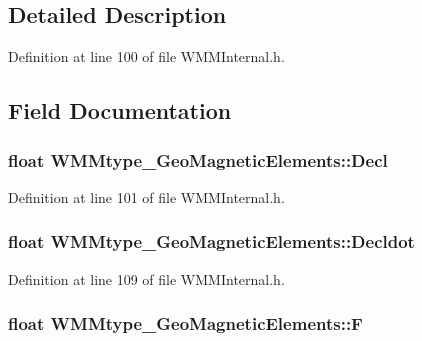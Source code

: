 \subsection{Detailed Description}


Definition at line 100 of file W\-M\-M\-Internal.\-h.



\subsection{Field Documentation}
\hypertarget{struct_w_m_mtype___geo_magnetic_elements_a9a93785970d529cbca6172d59ca0d225}{
\subsubsection[{Decl}]{\setlength{\rightskip}{0pt plus 5cm}float W\-M\-Mtype\-\_\-\-Geo\-Magnetic\-Elements\-::\-Decl}}\label{struct_w_m_mtype___geo_magnetic_elements_a9a93785970d529cbca6172d59ca0d225}


Definition at line 101 of file W\-M\-M\-Internal.\-h.

\hypertarget{struct_w_m_mtype___geo_magnetic_elements_a6c23bd42050e02810a937cd0316b9d8e}{
\subsubsection[{Decldot}]{\setlength{\rightskip}{0pt plus 5cm}float W\-M\-Mtype\-\_\-\-Geo\-Magnetic\-Elements\-::\-Decldot}}\label{struct_w_m_mtype___geo_magnetic_elements_a6c23bd42050e02810a937cd0316b9d8e}


Definition at line 109 of file W\-M\-M\-Internal.\-h.

\hypertarget{struct_w_m_mtype___geo_magnetic_elements_af97c7b8926ffd4d694c4292916c2c153}{
\subsubsection[{F}]{\setlength{\rightskip}{0pt plus 5cm}float W\-M\-Mtype\-\_\-\-Geo\-Magnetic\-Elements\-::\-F}}\label{struct_w_m_mtype___geo_magnetic_elements_af97c7b8926ffd4d694c4292916c2c153}


